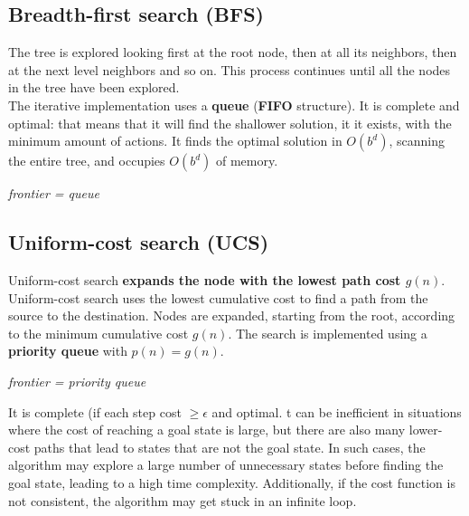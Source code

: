 \documentclass{article}
\begin{document}
\newpage

\subsection{Breadth-first search (BFS)}

The tree is explored looking first at the root node, then at all its neighbors, then at the next level neighbors and so on. This process continues until all the nodes in the tree have been explored. \\

The iterative implementation uses a \textbf{queue} (\textbf{FIFO} structure). It is complete and optimal: that means that it will find the shallower solution, it it exists, with the minimum amount of actions. It finds the optimal solution in $O(b^d)$, scanning the entire tree, and occupies $O(b^d)$ of memory.

\begin{center}
    \textit{frontier = queue}
\end{center}

\newpage

\subsection{Uniform-cost search (UCS)}

Uniform-cost search \textbf{expands the node with the lowest path cost $g(n)$}. \\

Uniform-cost search uses the lowest cumulative cost to find a path from the source to the destination. Nodes are expanded, starting from the root, according to the minimum cumulative cost $g(n)$. The search is implemented using a \textbf{priority queue} with $p(n) = g(n)$.

\begin{center}
    \textit{frontier = priority queue}
\end{center}

It is complete (if each step cost $\geq \epsilon$ and optimal. t can be inefficient in situations where the cost of reaching a goal state is large, but there are also many lower-cost paths that lead to states that are not the goal state. In such cases, the algorithm may explore a large number of unnecessary states before finding the goal state, leading to a high time complexity. Additionally, if the cost function is not consistent, the algorithm may get stuck in an infinite loop.

\newpage
\end{document}
